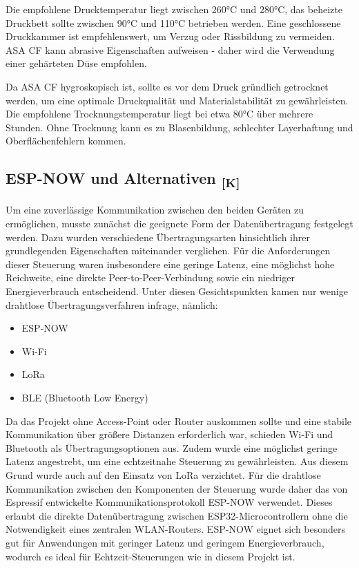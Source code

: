 \documentclass[a4paper,12pt]{article}
\begin{document}
Die empfohlene Drucktemperatur liegt zwischen 260°C und 280°C, das beheizte Druckbett sollte zwischen 90°C und 110°C betrieben werden. Eine geschlossene Druckkammer ist empfehlenswert, um Verzug oder Rissbildung zu vermeiden. ASA CF kann abrasive Eigenschaften aufweisen - daher wird die Verwendung einer gehärteten Düse empfohlen.

Da ASA CF hygroskopisch ist, sollte es vor dem Druck gründlich getrocknet werden, um eine optimale Druckqualität und Materialstabilität zu gewährleisten. Die empfohlene Trocknungstemperatur liegt bei etwa 80°C über mehrere Stunden. Ohne Trocknung kann es zu Blasenbildung, schlechter Layerhaftung und Oberflächenfehlern kommen.\cite{Bambu_Lab_Filament_ASA_CF}

\newpage


\subsection{\texorpdfstring{ESP-NOW und Alternativen \textsubscript{[K]}}{ESP-NOW und Alternativen [K]}}

Um eine zuverlässige Kommunikation zwischen den beiden Geräten zu ermöglichen, musste zunächst die geeignete Form der Datenübertragung festgelegt werden. Dazu wurden verschiedene Übertragungsarten hinsichtlich ihrer grundlegenden Eigenschaften miteinander verglichen. Für die Anforderungen dieser Steuerung waren insbesondere eine geringe Latenz, eine möglichst hohe Reichweite, eine direkte Peer-to-Peer-Verbindung sowie ein niedriger Energieverbrauch entscheidend. Unter diesen Gesichtspunkten kamen nur wenige drahtlose Übertragungsverfahren infrage, nämlich:
\begin{itemize}
    \item ESP-NOW
    \item Wi-Fi
    \item LoRa
    \item BLE (Bluetooth Low Energy)
\end{itemize}

Da das Projekt ohne Access-Point oder Router auskommen sollte und eine stabile Kommunikation über größere Distanzen erforderlich war, schieden Wi-Fi und Bluetooth als Übertragungsoptionen aus. Zudem wurde eine möglichst geringe Latenz angestrebt, um eine echtzeitnahe Steuerung zu gewährleisten. Aus diesem Grund wurde auch auf den Einsatz von LoRa verzichtet. Für die drahtlose Kommunikation zwischen den Komponenten der Steuerung wurde daher das von Espressif entwickelte Kommunikationsprotokoll ESP-NOW verwendet. Dieses erlaubt die direkte Datenübertragung zwischen ESP32-Microcontrollern ohne die Notwendigkeit eines zentralen WLAN-Routers. ESP-NOW eignet sich besonders gut für Anwendungen mit geringer Latenz und geringem Energieverbrauch, wodurch es ideal für Echtzeit-Steuerungen wie in diesem Projekt ist. 
\end{document}
